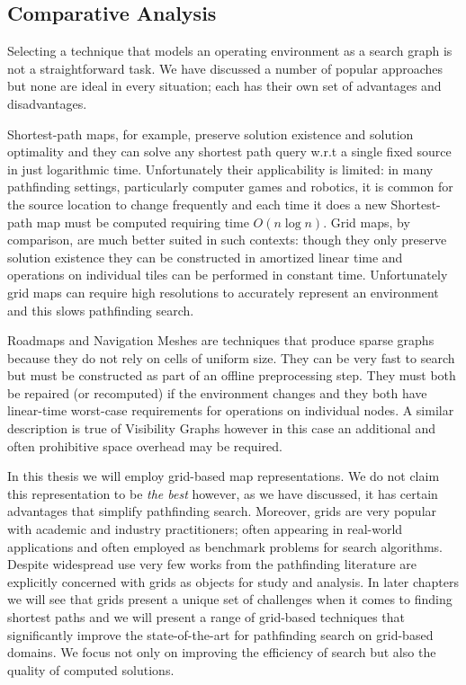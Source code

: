 \subsection{Comparative Analysis}
\label{cha::lit::graphs::analysis}
Selecting a technique that models an operating environment as a search graph
is not a straightforward task. We have discussed a number of popular
approaches but none are ideal in every situation; each has their own set of
advantages and disadvantages.

Shortest-path maps, for example, preserve solution existence and solution
optimality and they can solve any shortest path query w.r.t a single fixed
source  in just logarithmic time.  Unfortunately their applicability is
limited: in many pathfinding settings, particularly computer games and
robotics, it is common for the source location to change frequently and each
time it does a new Shortest-path map must be computed requiring time
$O(n\log{n})$.  Grid maps, by comparison, are much better suited in such
contexts: though they only preserve solution existence they can be constructed
in amortized linear time and operations on individual tiles can be performed
in constant time. Unfortunately grid maps can require high resolutions to
accurately represent an environment and this slows pathfinding search.

Roadmaps and Navigation Meshes are techniques that produce sparse graphs
because they do not rely on cells of uniform size.  They can be very fast to
search but must be constructed as part of an offline preprocessing step. They
must both be repaired (or recomputed) if the environment changes and they both
have linear-time worst-case requirements for operations on individual nodes.
A similar description is true of Visibility Graphs however in this case an
additional and often prohibitive space overhead may be required.

In this thesis we will employ grid-based map representations. We do not claim
this representation to be \emph{the best} however, as we have discussed, it
has certain advantages that simplify pathfinding search. Moreover, grids are
very popular with academic and industry practitioners; often appearing in
real-world applications and often employed as benchmark problems for search
algorithms.  Despite widespread use very few works from the pathfinding
literature are explicitly concerned with grids as objects for study and
analysis. In later chapters we will see that grids present a unique set of
challenges when it comes to finding shortest paths and we will present a range
of grid-based techniques that significantly improve the state-of-the-art for
pathfinding search on grid-based domains.  We focus not only on improving the
efficiency of search but also the quality of computed solutions.
